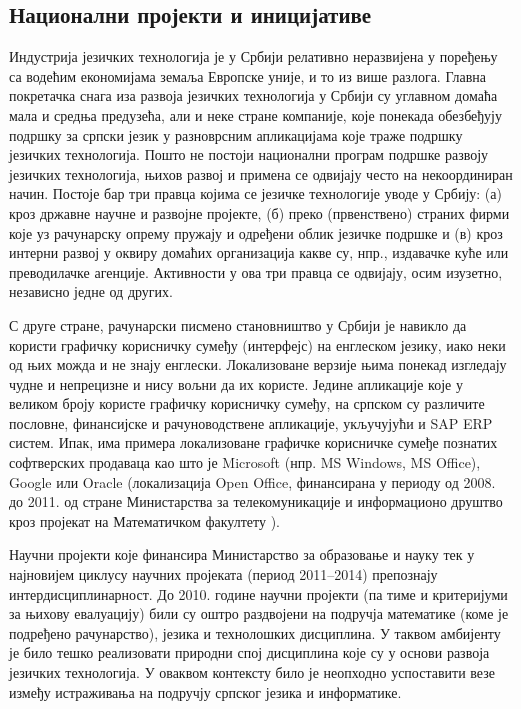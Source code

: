 {\begin{multicols}{2}
 \subsection {Национални пројекти и иницијативе}
   
Индустрија језичких технологија је у Србији релативно неразвијена у поређењу са водећим економијама земаља Европске уније, и то из више разлога. Главна покретачка снага иза развоја језичких технологија у Србији су углавном домаћа мала и средња предузећа, али и неке стране компаније, које понекада обезбеђују подршку за српски језик у разноврсним апликацијама које траже подршку језичких технологија. Пошто не постоји национални програм подршке развоју језичких технологија, њихов развој и примена се одвијају често на некоординиран начин. Постоје бар три правца којима се језичке технологије уводе у Србију: (а) кроз државне научне и развојне пројекте, (б) преко (првенствено) страних фирми које уз рачунарску опрему пружају и одређени облик језичке подршке и (в) кроз интерни развој у оквиру домаћих организација какве су, нпр., издавачке куће или преводилачке агенције. Активности у ова три правца се одвијају, осим изузетно, независно једне од других. 

С друге стране, рачунарски писмено становништво у Србији је навикло да користи графичку корисничку сумеђу (интерфејс) на енглеском језику, иако неки од њих можда и не знају енглески. Локализоване верзије њима понекад изгледају чудне и непрецизне и нису вољни да их користе. Једине апликације које у великом броју користе  графичку корисничку сумеђу, на српском су различите пословне, финансијске и рачуноводствене апликације, укључујући и SAP ERP систем. Ипак, има примера локализоване графичке корисничке сумеђе познатих софтверских продаваца као што је Microsoft (нпр. MS Windows, MS Office), Google или Oracle (локализација Open Office, финансирана у периоду од 2008. до 2011. од стране Министарства за телекомуникације и информационо друштво кроз пројекат на Математичком факултету \cite{OO_MATF}).

Научни пројекти које финансира Министарство за образовање и науку тек у најновијем циклусу научних пројеката (период 2011--2014) препознају интердисциплинарност. До 2010. године научни пројекти (па тиме и критеријуми за њихову евалуацију) били су оштро раздвојени на подручја математике (коме је подређено рачунарство), језика и технолошких дисциплина. У таквом амбијенту је било тешко реализовати природни спој дисциплина које су у основи развоја језичких технологија. У оваквом контексту било је неопходно успоставити везе између истраживања на подручју српског језика и информатике. 


\end{multicols}}
